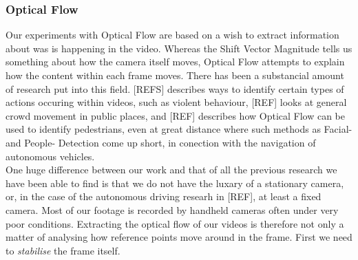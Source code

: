 \subsubsection{Optical Flow}
%
%
%
Our experiments with Optical Flow are based on a wish to extract information about was is happening in the video. Whereas the Shift Vector Magnitude tells us something about how the camera itself moves, Optical Flow attempts to explain how the content within each frame moves. There has been a substancial amount of research put into this field. [REFS] describes ways to identify certain types of actions occuring within videos, such as violent behaviour, [REF] looks at general crowd movement in public places, and [REF] describes how Optical Flow can be used to identify pedestrians, even at great distance where such methods as Facial- and People- Detection come up short, in conection with the navigation of autonomous vehicles.\\
%
One huge difference between our work and that of all the previous research we have been able to find is that we do not have the luxary of a stationary camera, or, in the case of the autonomous driving researh in [REF], at least a fixed camera. Most of our footage is recorded by handheld cameras often under very poor conditions. Extracting the optical flow of our videos is therefore not only a matter of analysing how reference points move around in the frame. First we need to \textit{stabilise} the frame itself.\\
%

